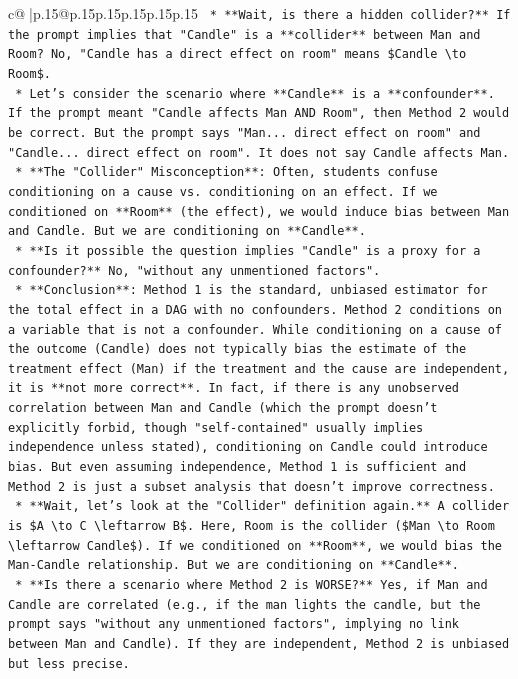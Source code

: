 \documentclass{article}
\begin{document}
{\begin{supertabular}{c@{$\;$}|p{.15\linewidth}@{}p{.15\linewidth}p{.15\linewidth}p{.15\linewidth}p{.15\linewidth}p{.15\linewidth}}
{{{\texttt{    *   **Wait, is there a hidden collider?** If the prompt implies that "Candle" is a **collider** between Man and Room? No, "Candle has a direct effect on room" means \$Candle \textbackslash{}to Room\$.} \\
\texttt{    *   Let's consider the scenario where **Candle** is a **confounder**. If the prompt meant "Candle affects Man AND Room", then Method 2 would be correct. But the prompt says "Man... direct effect on room" and "Candle... direct effect on room". It does not say Candle affects Man.} \\
\texttt{    *   **The "Collider" Misconception**: Often, students confuse conditioning on a cause vs. conditioning on an effect. If we conditioned on **Room** (the effect), we would induce bias between Man and Candle. But we are conditioning on **Candle**.} \\
\texttt{    *   **Is it possible the question implies "Candle" is a proxy for a confounder?** No, "without any unmentioned factors".} \\
\texttt{    *   **Conclusion**: Method 1 is the standard, unbiased estimator for the total effect in a DAG with no confounders. Method 2 conditions on a variable that is not a confounder. While conditioning on a cause of the outcome (Candle) does not typically bias the estimate of the treatment effect (Man) if the treatment and the cause are independent, it is **not more correct**. In fact, if there is any unobserved correlation between Man and Candle (which the prompt doesn't explicitly forbid, though "self{-}contained" usually implies independence unless stated), conditioning on Candle could introduce bias. But even assuming independence, Method 1 is sufficient and Method 2 is just a subset analysis that doesn't improve correctness.} \\
\texttt{    *   **Wait, let's look at the "Collider" definition again.** A collider is \$A \textbackslash{}to C \textbackslash{}leftarrow B\$. Here, Room is the collider (\$Man \textbackslash{}to Room \textbackslash{}leftarrow Candle\$). If we conditioned on **Room**, we would bias the Man{-}Candle relationship. But we are conditioning on **Candle**.} \\
\texttt{    *   **Is there a scenario where Method 2 is WORSE?** Yes, if Man and Candle are correlated (e.g., if the man lights the candle, but the prompt says "without any unmentioned factors", implying no link between Man and Candle). If they are independent, Method 2 is unbiased but less precise.} \\
}}}
\end{supertabular}}
\end{document}
